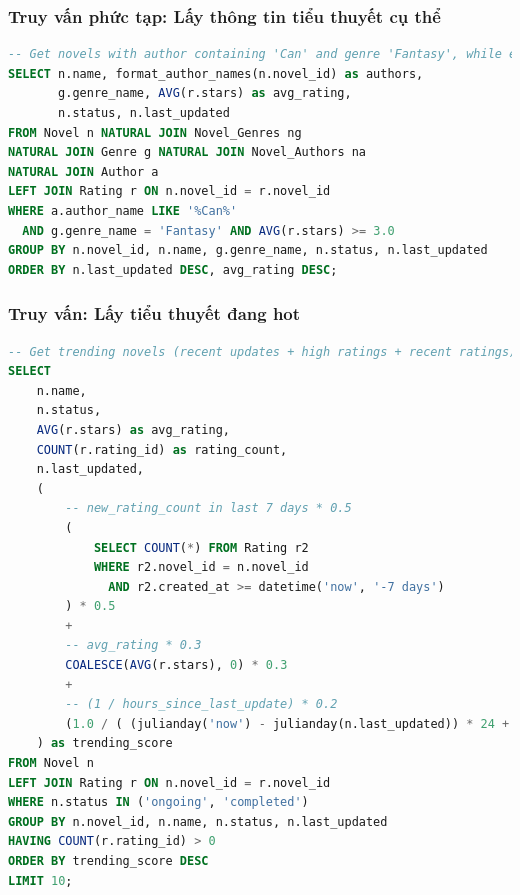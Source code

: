 \documentclass[12pt,aspectratio=169,handout]{beamer}
\begin{document}
\begin{frame}[fragile]
\frametitle{Truy vấn phức tạp: Lấy thông tin tiểu thuyết cụ thể}
\begin{lstlisting}[language=SQL, basicstyle=\small\ttfamily]
-- Get novels with author containing 'Can' and genre 'Fantasy', while excluding those with low ratings
SELECT n.name, format_author_names(n.novel_id) as authors, 
       g.genre_name, AVG(r.stars) as avg_rating, 
       n.status, n.last_updated
FROM Novel n NATURAL JOIN Novel_Genres ng
NATURAL JOIN Genre g NATURAL JOIN Novel_Authors na
NATURAL JOIN Author a
LEFT JOIN Rating r ON n.novel_id = r.novel_id
WHERE a.author_name LIKE '%Can%' 
  AND g.genre_name = 'Fantasy' AND AVG(r.stars) >= 3.0
GROUP BY n.novel_id, n.name, g.genre_name, n.status, n.last_updated
ORDER BY n.last_updated DESC, avg_rating DESC;
\end{lstlisting}
\end{frame}

\begin{frame}[fragile]
\frametitle{Truy vấn: Lấy tiểu thuyết đang hot}
\begin{lstlisting}[language=SQL, basicstyle=\scriptsize\ttfamily]
-- Get trending novels (recent updates + high ratings + recent ratings)
SELECT 
    n.name, 
    n.status,
    AVG(r.stars) as avg_rating,
    COUNT(r.rating_id) as rating_count,
    n.last_updated,
    (
        -- new_rating_count in last 7 days * 0.5
        (
            SELECT COUNT(*) FROM Rating r2
            WHERE r2.novel_id = n.novel_id
              AND r2.created_at >= datetime('now', '-7 days')
        ) * 0.5
        +
        -- avg_rating * 0.3
        COALESCE(AVG(r.stars), 0) * 0.3
        +
        -- (1 / hours_since_last_update) * 0.2
        (1.0 / ( (julianday('now') - julianday(n.last_updated)) * 24 + 1 )) * 0.2
    ) as trending_score
FROM Novel n
LEFT JOIN Rating r ON n.novel_id = r.novel_id
WHERE n.status IN ('ongoing', 'completed')
GROUP BY n.novel_id, n.name, n.status, n.last_updated
HAVING COUNT(r.rating_id) > 0
ORDER BY trending_score DESC
LIMIT 10;
\end{lstlisting}
\end{frame}
\end{document}
